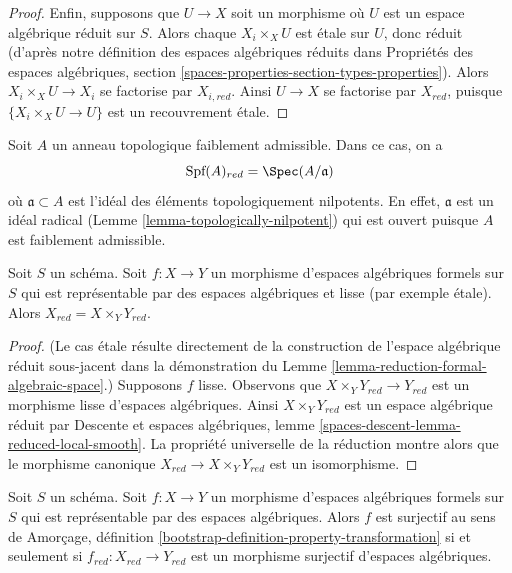\begin{proof}
\medskip\noindent
Enfin, supposons que $U \to X$ soit un morphisme où
$U$ est un espace algébrique réduit sur $S$. Alors chaque $X_i \times_X U$
est étale sur $U$, donc réduit (d'après notre définition des
espaces algébriques réduits dans Propriétés des espaces algébriques, section
\ref{spaces-properties-section-types-properties}).
Alors $X_i \times_X U \to X_i$ se factorise par $X_{i, red}$.
Ainsi $U \to X$ se factorise par $X_{red}$, puisque
$\{X_i \times_X U \to U\}$ est un recouvrement étale.
\end{proof}

\begin{example}
\label{example-reduction-affine-formal-spectrum}
Soit $A$ un anneau topologique faiblement admissible. Dans ce cas, on a
$$
\text{Spf}(A)_{red} = \Spec(A/\mathfrak a)
$$
où $\mathfrak a \subset A$ est l'idéal des éléments topologiquement
nilpotents. En effet, $\mathfrak a$ est un idéal radical
(Lemme \ref{lemma-topologically-nilpotent})
qui est ouvert puisque $A$ est faiblement admissible.
\end{example}

\begin{lemma}
\label{lemma-reduction-smooth}
Soit $S$ un schéma. Soit $f : X \to Y$ un morphisme d'espaces
algébriques formels sur $S$ qui est représentable par des
espaces algébriques et lisse (par exemple étale).
Alors $X_{red} = X \times_Y Y_{red}$.
\end{lemma}

\begin{proof}
(Le cas étale résulte directement de la construction de
l'espace algébrique réduit sous-jacent dans la démonstration du
Lemme \ref{lemma-reduction-formal-algebraic-space}.)
Supposons $f$ lisse. Observons que $X \times_Y Y_{red} \to Y_{red}$
est un morphisme lisse d'espaces algébriques. Ainsi $X \times_Y Y_{red}$
est un espace algébrique réduit par Descente et espaces algébriques, lemme
\ref{spaces-descent-lemma-reduced-local-smooth}.
La propriété universelle de la réduction montre alors que le morphisme canonique
$X_{red} \to X \times_Y Y_{red}$ est un isomorphisme.
\end{proof}

\begin{lemma}
\label{lemma-reduction-surjective}
Soit $S$ un schéma. Soit $f : X \to Y$ un morphisme d'espaces
algébriques formels sur $S$ qui est représentable par des
espaces algébriques. Alors $f$ est surjectif au sens de
Amorçage, définition \ref{bootstrap-definition-property-transformation}
si et seulement si $f_{red} : X_{red} \to Y_{red}$ est un
morphisme surjectif d'espaces algébriques.
\end{lemma}

